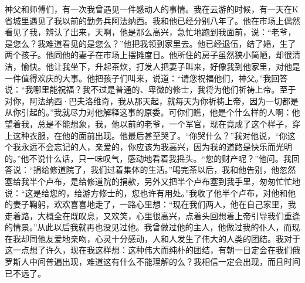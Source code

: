 \par 神父和师傅们，有一次我曾遇见一件感动人的事情。我在云游的时候，有一天在K省城里遇见了我以前的勤务兵阿法纳西。我和他已经分别八年了。他在市场上偶然看见了我，辨认了出来，天啊，他是那么高兴，急忙地跑到我面前，说：“老爷，是您么？我难道看见的是您么？”他把我领到家里去。他已经退伍，结了婚，生了两个孩子。他同他的妻子在市场上摆摊度日。他所住的房子虽然狭小简陋，却很清洁，愉快。他让我坐下，升起茶炊，打发人把妻子叫来，好像我到他家里，对他是一件值得欢庆的大事。他把孩子们叫来，说道：“请您祝福他们，神父。”我回答说：“我哪里能祝福？我不过是普通的、卑微的修士，我将为他们祈祷上帝。至于对你，阿法纳西·巴夫洛维奇，我从那天起，就每天为你祈祷上帝，因为一切都是从你引起的。”我就尽力对他解释这事的原委。可你们瞧，他是个什么样的人啊：他望着我，总是不能想象，我，他以前的老爷，一个军官，现在竟成了这个样子，穿上这种衣服，在他的面前出现。他最后甚至哭了。“你哭什么？”我对他说，“你这个我永远不会忘记的人，亲爱的，你应该为我高兴，因为我的道路是快乐而光明的。”他不说什么话，只一味叹气，感动地看着我摇头。“您的财产呢？”他问。我回答说：“捐给修道院了，我们过着集体的生活。”喝完茶以后，我和他告别，他忽然塞给我半个卢布，是给修道院的捐款，另外又把半个卢布塞到我手里，匆匆忙忙地说：“这是给您的，给游方修士的，您也许有用处。”我收了他半个卢布，对他和他的妻子鞠躬，欢欢喜喜地走了，一路心里想：“现在我们两人，他在自己家里，我走着路，大概全在既叹息，又欢笑，心里很高兴，点着头回想着上帝引导我们重逢的情景。”从此以后我就再也没见过他。我曾做过他的主人，他做过我的仆人，而现在我却同他友爱地亲吻，心灵十分感动，人和人发生了伟大的人类的团结。我对于这一点想了许久，现在我这样想：这种伟大而纯朴的团结，有朝一日定会在我们俄罗斯人中间普遍出现，难道这有什么不能理解的么？我相信一定会出现，而且时间已不远了。
